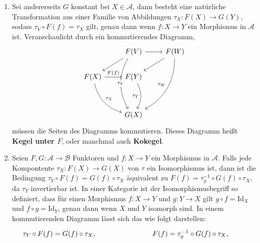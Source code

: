 \documentclass{article}
\theoremstyle{plain}
\theoremstyle{definition}
\theoremstyle{remark}
\begin{document}
\begin{enumerate}
	\item Sei andererseits $G$ konstant bei $X \in \mathcal{A}$, dann besteht eine natürliche Transformation aus einer Familie von Abbildungen $\tau_X: F(X) \rightarrow G(Y)$, sodass $\tau_Y \circ F(f) = \tau_X$ gilt, genau dann wenn $f: X \rightarrow Y$ ein Morphismus in $\mathcal{A}$ ist. Veranschaulicht durch ein kommutierendes Diagramm,
	\begin{equation}
		\begin{tikzcd}
		                                                         & F(V) \arrow[ld] \arrow[r] \arrow[ddd, "\tau_V" description, bend right, shift right] & F(W) \arrow[ld] \arrow[lddd, "\tau_W"', bend left] \\
		F(X) \arrow[r, "F(f)"] \arrow[rdd, "\tau_X", bend right] & F(Y) \arrow[dd, "\tau_Y"', bend left]                                                &                                                    \\
		                                                         &                                                                                      &                                                    \\
		                                                         & G(X)                                                                                 &                                                   
		\end{tikzcd}
	\end{equation}
	müssen die Seiten des Diagramms kommutieren. Dieses Diagramm heißt \textbf{Kegel unter $F$}, oder manchmal auch \textbf{Kokegel}.
	\item Seien $F,G: \mathcal{A} \rightarrow \mathcal{B}$ Funktoren und $f: X \rightarrow Y$ ein Morphismus in $\mathcal{A}$. Falls jede Kompontente $\tau_X: F(X) \rightarrow G(X)$ von $\tau$ ein Isomorphismus ist, dann ist die Bedingung $\tau_Y \circ F(f) = G(f) \circ \tau_X$ äquivalent zu $F(f) = \tau_y^{-1} \circ G(f) \circ \tau_X$, da $\tau_Y$ invertierbar ist. In einer Kategorie ist der Isomorphismusbegriff so definiert, dass für einen Morphismus $f:X \rightarrow Y$ und $g:Y \rightarrow X$ gilt $g \circ f = \text{Id}_X$ und $f \circ g = \text{Id}_Y$, genau dann wenn $X$ und $Y$ isomorph sind. In einem kommutierenden Diagramm lässt sich das wie folgt darstellen:
	\begin{equation}
		\begin{tikzcd}
		{\tau_Y \circ F(f) = G(f) \circ \tau_X,}   &                          &  & F(f) = \tau_y^{-1} \circ G(f) \circ \tau_X,            &                                \\

\end{tikzcd}
\end{equation}
\end{enumerate}
\end{document}
